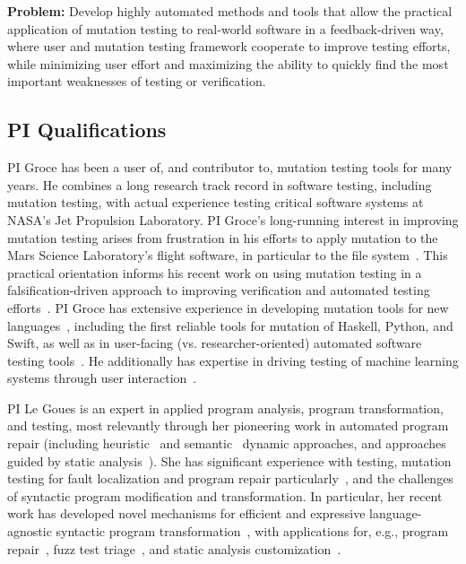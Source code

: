 \begin{framed} {\bf Problem:} Develop highly automated methods and tools that
  allow the practical application of mutation testing to real-world software in
  a feedback-driven way, where user and mutation testing framework cooperate to
  improve testing efforts, while minimizing user effort and maximizing the
  ability to quickly find the most important weaknesses of testing or
  verification.
\end{framed}



\subsection{PI Qualifications}

PI Groce has been a user of, and contributor to, mutation testing tools for many
years.  He combines a long research track record in software testing, including
mutation testing, with actual experience testing critical software systems at
NASA's Jet Propulsion Laboratory.  PI Groce's long-running interest in improving
mutation testing arises from frustration in his efforts to apply mutation to the
Mars Science Laboratory's flight software, in particular to the file
system~\cite{ICSEDiff,CFV08,AMAI}.  This practical orientation informs his
recent work on using mutation testing in a falsification-driven approach to
improving verification and automated testing
efforts~\cite{groce2015verified,groce2018verified,mutKernel}.  PI Groce has
extensive experience in developing mutation tools for new
languages~\cite{le2014mucheck,muupi,regexpMut}, including the first reliable
tools for mutation of Haskell, Python, and Swift, as well as in user-facing
(vs. researcher-oriented) automated software testing
tools~\cite{tstlsttt,DeepState}.  He additionally has expertise in driving
testing of machine learning systems through user
interaction~\cite{EndUserMistake,OnlyOracle}. 

PI Le Goues is an expert in applied program analysis, program transformation,
and testing, most relevantly through her pioneering work in automated program
repair (including heuristic~\cite{genprog1,another-genprog} and
semantic~\cite{s3,Ke15ase} dynamic approaches, and approaches guided by
static analysis~\cite{footpatch}).  She has significant experience
with testing, mutation testing for fault localization and program repair
particularly~\cite{ssbse,faultloc}, and the challenges of syntactic program
modification and transformation.  In particular, her recent work has developed
novel mechanisms for efficient and expressive language-agnostic syntactic
program transformation~\cite{rvt-ppc}, with applications for, e.g., program
repair~\cite{footpatch}, fuzz test triage~\cite{vantonder-ase18}, and static analysis
customization~\cite{icse-underreview}.  
